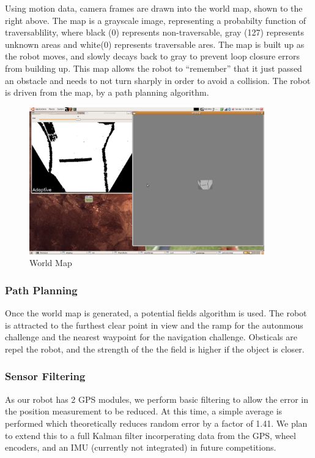 Using motion data, camera frames are drawn into the world map, shown to the right above. The map is a grayscale image, representing a probabilty function of traversablility, where black (0) represents non-traversable, gray (127) represents unknown areas and white(0) represents traversable ares. The map is built up as the robot moves, and slowly decays back to gray to prevent loop closure errors from building up. This map allows the robot to “remember” that it just passed an obstacle and needs to not turn sharply in order to avoid a collision. The robot is driven from the map, by a path planning algorithm.

\begin{figure}[H]
\begin{center}
\includegraphics[width=4in]{./pics/map.png}
\caption{World Map}
\label{FIG:Map}
\end{center}
\end{figure}

\subsubsection{Path Planning}

Once the world map is generated, a potential fields algorithm is used. The robot is attracted to the furthest clear point in view and the ramp for the autonmous challenge and the nearest waypoint for the navigation challenge. Obsticals are repel the robot, and the strength of the the field is higher if the object is closer.

\subsubsection{Sensor Filtering}

As our robot has 2 GPS modules, we perform basic filtering to allow the error in the position measurement to be reduced. At this time, a simple average is performed which theoretically reduces random error by a factor of 1.41. We plan to extend this to a full Kalman filter incorperating data from the GPS, wheel encoders, and an IMU (currently not integrated) in future competitions.


